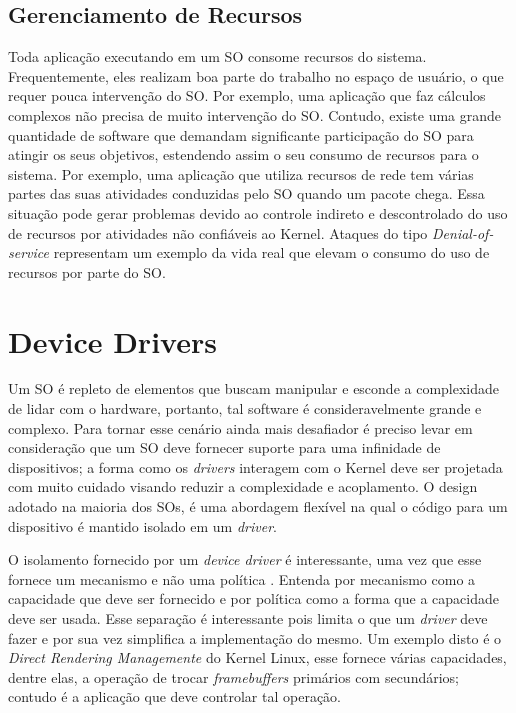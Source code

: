 \subsection{Gerenciamento de Recursos}

Toda aplicação executando em um SO consome recursos do sistema. Frequentemente,
eles realizam boa parte do trabalho no espaço de usuário, o que requer pouca
intervenção do SO. Por exemplo, uma aplicação que faz cálculos complexos não
precisa de muito intervenção do SO. Contudo, existe uma grande quantidade de
software que demandam significante participação do SO para atingir os seus
objetivos, estendendo assim o seu consumo de recursos para o sistema. Por
exemplo, uma aplicação que utiliza recursos de rede tem várias partes das suas
atividades conduzidas pelo SO quando um pacote chega. Essa situação pode gerar
problemas devido ao controle indireto e descontrolado do uso de recursos por
atividades não confiáveis ao Kernel. Ataques do tipo \emph{Denial-of-service}
representam um exemplo da vida real que elevam o consumo do uso de recursos por
parte do SO.



\section{Device Drivers}
\label{sec:dd}

Um SO é repleto de elementos que buscam manipular e esconde a complexidade de
lidar com o hardware, portanto, tal software é consideravelmente grande e
complexo. Para tornar esse cenário ainda mais desafiador é preciso levar em
consideração que um SO deve fornecer suporte para uma infinidade de
dispositivos; a forma como os \emph{drivers} interagem com o Kernel deve ser
projetada com muito cuidado visando reduzir a complexidade e acoplamento.  O
design adotado na maioria dos SOs, é uma abordagem flexível na qual o código
para um dispositivo é mantido isolado em um \emph{driver}.

O isolamento fornecido por um \emph{device driver} é interessante, uma vez que
esse fornece um mecanismo e não uma política \cite{ddbook}. Entenda por
mecanismo como a capacidade que deve ser fornecido e por política como a forma
que a capacidade deve ser usada. Esse separação é interessante pois limita o
que um \emph{driver} deve fazer e por sua vez simplifica a implementação do
mesmo. Um exemplo disto é o \emph{Direct Rendering Managemente} do Kernel
Linux, esse fornece várias capacidades, dentre elas, a operação de trocar
\emph{framebuffers} primários com secundários; contudo é a aplicação que deve
controlar tal operação.

